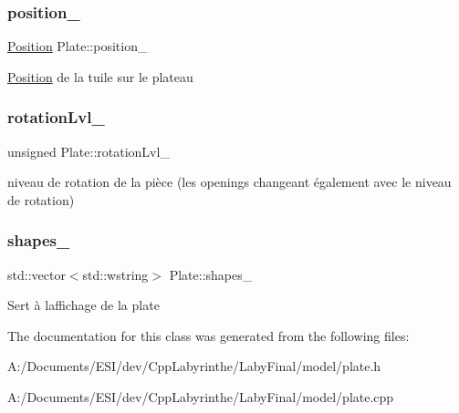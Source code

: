 \subsubsection{\texorpdfstring{position\_}{position\_}}
{\footnotesize\ttfamily \mbox{\hyperlink{class_position}{Position}} Plate\+::position\+\_\+\hspace{0.3cm}{\ttfamily [protected]}}

\mbox{\hyperlink{class_position}{Position}} de la tuile sur le plateau \mbox{\label{class_plate_a02ccbda576b947364d5ae62b8ec15b61}} 
\subsubsection{\texorpdfstring{rotationLvl\_}{rotationLvl\_}}
{\footnotesize\ttfamily unsigned Plate\+::rotation\+Lvl\+\_\+\hspace{0.3cm}{\ttfamily [protected]}}

niveau de rotation de la pièce (les openings changeant également avec le niveau de rotation) \mbox{\label{class_plate_a6c1abc6a89b53eb901f19c2aaaf0320a}} 
\subsubsection{\texorpdfstring{shapes\_}{shapes\_}}
{\footnotesize\ttfamily std\+::vector$<$std\+::wstring$>$ Plate\+::shapes\+\_\+\hspace{0.3cm}{\ttfamily [protected]}}

Sert à l\textquotesingle{}affichage de la plate 

The documentation for this class was generated from the following files\+:\begin{DoxyCompactItemize}
\item 
A\+:/\+Documents/\+E\+S\+I/dev/\+Cpp\+Labyrinthe/\+Laby\+Final/model/plate.\+h\item 
A\+:/\+Documents/\+E\+S\+I/dev/\+Cpp\+Labyrinthe/\+Laby\+Final/model/plate.\+cpp\end{DoxyCompactItemize}
